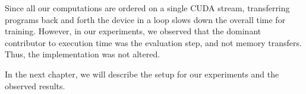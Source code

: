Since all our computations are ordered on a single CUDA stream, transferring programs back and forth the device in a loop slows down the overall time for training. However, in our experiments, we observed that the dominant contributor to execution time was the evaluation step, and not memory transfers. Thus, the implementation was not altered.

In the next chapter, we will describe the setup for our experiments and the observed results. 
